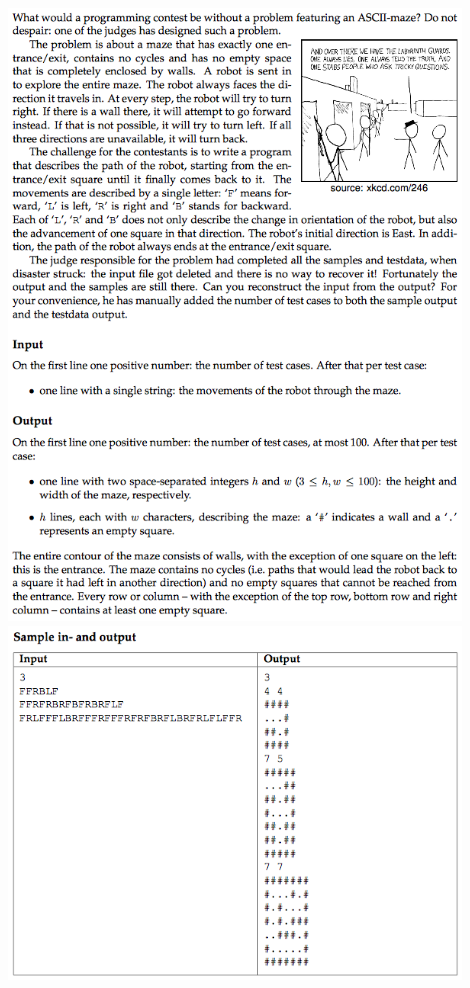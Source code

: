 \documentclass[a4paper,12pt]{article}
\begin{document}
\begin{center}
\includegraphics[width=0.9\textwidth]{CT_S02E08/CT_S02E08_J1.png}\\ [1cm]
\includegraphics[width=0.9\textwidth]{CT_S02E08/CT_S02E08_J2.png}\\ [1cm]
\end{center}
\end{document}
